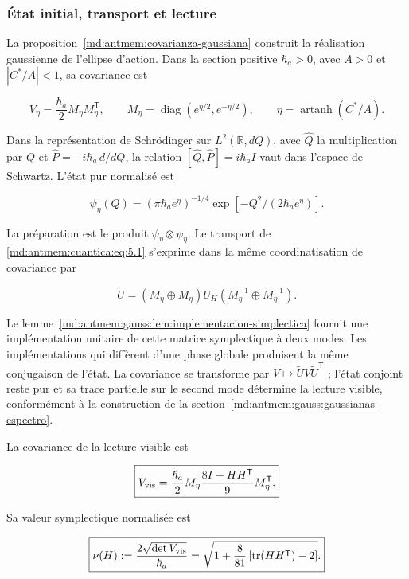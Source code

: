\subsubsection{État initial, transport et lecture}

La proposition~\ref{md:antmem:covarianza-gaussiana} construit la réalisation gaussienne de l’ellipse d’action. Dans la section positive \(\hbar_a>0\), avec \(A>0\) et \(|C^*/A|<1\), sa covariance est


\begin{equation}
V_\eta=\frac{\hbar_a}{2}M_\eta M_\eta^{\mathsf T},\qquad
M_\eta=\operatorname{diag}(e^{\eta/2},e^{-\eta/2}),\qquad
\eta=\operatorname{artanh}(C^*/A).
\label{md:antmem:cuantica:eq:5.4}
\end{equation}

Dans la représentation de Schrödinger sur \(L^2(\mathbb R,dQ)\), avec \(\widehat Q\) la multiplication par \(Q\) et \(\widehat P=-i\hbar_a\,d/dQ\), la relation \([\widehat Q,\widehat P]=i\hbar_a I\) vaut dans l’espace de Schwartz. L’état pur normalisé est

\[
\psi_\eta(Q)=(\pi\hbar_a e^\eta)^{-1/4}
\exp[-Q^2/(2\hbar_a e^\eta)].
\]

La préparation est le produit \(\psi_\eta\otimes\psi_\eta\). Le transport de \eqref{md:antmem:cuantica:eq:5.1} s’exprime dans la même coordinatisation de covariance par

\begin{equation}
\widetilde U=(M_\eta\oplus M_\eta)U_H
(M_\eta^{-1}\oplus M_\eta^{-1}).
\label{md:antmem:cuantica:eq:5.5}
\end{equation}

Le lemme~\ref{md:antmem:gauss:lem:implementacion-simplectica} fournit une implémentation unitaire de cette matrice symplectique à deux modes. Les implémentations qui diffèrent d’une phase globale produisent la même conjugaison de l’état. La covariance se transforme par \(V\mapsto\widetilde U V\widetilde U^{\mathsf T}\) ; l’état conjoint reste pur et sa trace partielle sur le second mode détermine la lecture visible, conformément à la construction de la section~\ref{md:antmem:gauss:gaussianas-espectro}.

\begin{theorem}

La covariance de la lecture visible est

\begin{equation}
\boxed{V_{\rm vis}=
\frac{\hbar_a}{2}M_\eta
\frac{8I+HH^{\mathsf T}}9
M_\eta^{\mathsf T}.}
\label{md:antmem:cuantica:eq:5.6}
\end{equation}

Sa valeur symplectique normalisée est

\begin{equation}
\boxed{\nu(H):=\frac{2\sqrt{\det V_{\rm vis}}}{\hbar_a}
=\sqrt{1+\frac8{81}\left[\operatorname{tr}(HH^{\mathsf T})-2\right]}.}
\label{md:antmem:cuantica:eq:5.7}
\end{equation}
\end{theorem}

